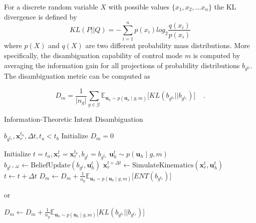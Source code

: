 \documentclass[letterpaper, 10 pt, conference]{ieeeconf}  %
\begin{document}
For a discrete random variable $X$ with possible values $\{x_1, x_2,\dots x_n\}$ the KL divergence is defined by
\begin{equation*}
	KL(P||Q) = -\sum_{i=1}^{n}p(x_i)log_2\frac{q(x_i)}{p(x_i)}
\end{equation*}
where $p(X)$ and $q(X)$ are two different probability mass distributions. 
More specifically, the disambiguation capability of control mode $m$ is computed by averaging the information gain for all projections of probability distributions $b_{g^{t_b}}$.  The disambiguation metric can be computed as 

\begin{equation}\label{eq:kldiv}
	D_m = \frac{1}{\vert n_g \vert} \sum_{g \in \mathcal{G}}^{} \mathbb{E}_{\boldsymbol{u}_h \sim p(\boldsymbol{u}_h \; | \; g, m)}\Big[KL(b_{g^{t_b}}||b_{g^{t_a}})\Big] \;\;\;\;.
\end{equation}

\begin{algorithm}[h]
	\caption{Information-Theoretic Intent Disambiguation}
	\label{alg:disamb}
	\begin{algorithmic}[1]
		\REQUIRE $b_{g^{t_a}}, \boldsymbol{x}_r^{t_a}, \Delta t, t_a < t_b$
		\STATE Initialize $D_m = 0$
		
		\STATE Initialize $t = t_a, \boldsymbol{x}_r^{t} = \boldsymbol{x}_r^{t_a}, b_{g^{t}} = b_{g^{t_a}}$
		\STATE $\boldsymbol{u}_h^t \sim p(\boldsymbol{u}_h\;|\; g, m)$ 
		\STATE $b_{g^{t + \Delta t}} \leftarrow \text{BeliefUpdate}(b_{g^{t}}, \boldsymbol{u}_h^t)$
		\STATE $\boldsymbol{x}_r^{t + \Delta t}\leftarrow \text{SimulateKinematics}(\boldsymbol{x}_r^{t}, \boldsymbol{u}_h^t)$
		\STATE $t \leftarrow t + \Delta t$
		\ENDWHILE
		\STATE $D_m \leftarrow D_m + \frac{1}{n_g} \mathbb{E}_{\boldsymbol{u}_h \sim p(\boldsymbol{u}_h \; | \; g, m)}\Big[ENT(b_{g^{t_b}})\Big] $
		
		or
		
		\STATE $D_m \leftarrow D_m + \frac{1}{n_g} \mathbb{E}_{\boldsymbol{u}_h \sim p(\boldsymbol{u}_h \; | \; g, m)}\Big[KL(b_{g^{t_b}}||b_{g^{t_a}})\Big] $
		\ENDFOR
		\ENDFOR
	\end{algorithmic}
\end{algorithm}
\end{document}
